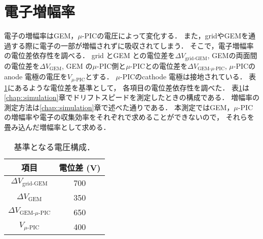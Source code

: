 \documentclass[../master]{subfiles}
\begin{document}
\section{電子増幅率}
電子の増幅率はGEM，$\mu$-PICの電圧によって変化する．
また，gridやGEMを通過する際に電子の一部が増幅されずに吸収されてしまう．
そこで，電子増幅率の電位差依存性を調べる．
grid とGEM との電位差を$\Delta V_{\text{grid-GEM}}$, GEMの両面間の電位差を$\Delta V_{\text{GEM}}$,
GEM の$\mu$-PIC側と$\mu$-PICとの電位差を$\Delta V_{\text{GEM-}\mu\text{-PIC}}$,
$\mu$-PICのanode 電極の電圧を$V_{\mu\text{-PIC}}$とする．
$\mu$-PICのcathode 電極は接地されている．
表\ref{tab::voltage_configuration}にあるような電位差を基準として，
各項目の電位差依存性を調べた．
表\ref{tab::voltage_configuration}は\ref{chap::simulation}章でドリフトスピードを測定したときの構成である．
増幅率の測定方法は\ref{chap::simulation}章で述べた通りである．
本測定ではGEM，$\mu$-PICの増幅率や電子の収集効率をそれぞれで求めることができないので，
それらを畳み込んだ増幅率として求める．
\begin{table}
  \centering
  \caption{基準となる電圧構成．}
  \label{tab::voltage_configuration}
%  
  \begin{tabular}{cc}
    \toprule
    項目 & 電位差 (\si{\volt}) \\
    \midrule
    $\Delta V_{\text{grid-GEM}}$ & 700 \\
    $\Delta V_{\text{GEM}}$ & 350 \\
    $\Delta V_{\text{GEM-}\mu\text{-PIC}}$ & 650 \\
    $V_{\mu\text{-PIC}}$ & 400 \\
    \bottomrule
  \end{tabular}
\end{table}

\end{document}
